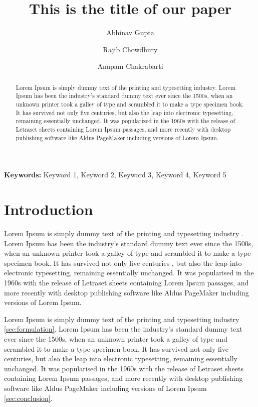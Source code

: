 \documentclass[10pt,a4paper, oneside]{article}
\theoremstyle{remark}
\providecommand{\keywords}[1]{\textbf{{Keywords:}} #1}
\begin{document}
	\title{This is the title of our paper}
	\author[1]{Abhinav Gupta}
	\author[1]{Rajib Chowdhury}
	\author[1]{Anupam Chakrabarti}

	\thispagestyle{empty}
	\newpage

	\maketitle
	\setcounter{page}{1}

	\begin{abstract}
		Lorem Ipsum is simply dummy text of the printing and typesetting industry. Lorem Ipsum has been the industry's standard dummy text ever since the 1500s, when an unknown printer took a galley of type and scrambled it to make a type specimen book. It has survived not only five centuries, but also the leap into electronic typesetting, remaining essentially unchanged. It was popularized in the 1960s with the release of Letraset sheets containing Lorem Ipsum passages, and more recently with desktop publishing software like Aldus PageMaker including versions of Lorem Ipsum.
	\end{abstract}
	\keywords{Keyword 1, Keyword 2, Keyword 3, Keyword 4, Keyword 5}
	\section{Introduction}
	Lorem Ipsum is simply dummy text of the printing and typesetting industry \citet{gupta55lineCodeLargescale2020}. Lorem Ipsum has been the industry's standard dummy text ever since the 1500s, when an unknown printer took a galley of type and scrambled it to make a type specimen book. It has survived not only five centuries \citep{guptaAutoadaptiveSubsteppingAlgorithm2020a,mandalLengthScaleInsensitive2020a}, but also the leap into electronic typesetting, remaining essentially unchanged. It was popularised in the 1960s with the release of Letraset sheets containing Lorem Ipsum passages, and more recently with desktop publishing software like Aldus PageMaker including versions of Lorem Ipsum.

	Lorem Ipsum is simply dummy text of the printing and typesetting industry \cref{sec:formulation}. Lorem Ipsum  has been the industry's standard dummy text ever since the 1500s, when an unknown printer took a galley of type and scrambled it to make a type specimen book. It has survived not only five centuries, but also the leap into electronic typesetting, remaining essentially unchanged. It was popularised in the 1960s with the release of Letraset sheets containing Lorem Ipsum passages, and more recently with desktop publishing software like Aldus PageMaker including versions of Lorem Ipsum \cref{sec:conclusion}.
\end{document}
